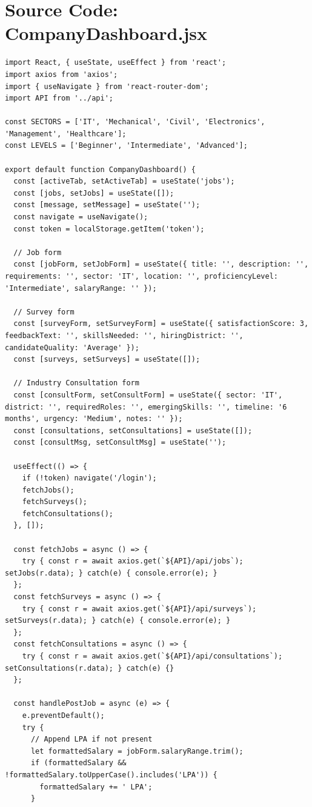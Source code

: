 \documentclass[12pt,a4paper]{report}
\begin{document}
\section*{Source Code: CompanyDashboard.jsx}
\begin{verbatim}
import React, { useState, useEffect } from 'react';
import axios from 'axios';
import { useNavigate } from 'react-router-dom';
import API from '../api';

const SECTORS = ['IT', 'Mechanical', 'Civil', 'Electronics', 'Management', 'Healthcare'];
const LEVELS = ['Beginner', 'Intermediate', 'Advanced'];

export default function CompanyDashboard() {
  const [activeTab, setActiveTab] = useState('jobs');
  const [jobs, setJobs] = useState([]);
  const [message, setMessage] = useState('');
  const navigate = useNavigate();
  const token = localStorage.getItem('token');

  // Job form
  const [jobForm, setJobForm] = useState({ title: '', description: '', requirements: '', sector: 'IT', location: '', proficiencyLevel: 'Intermediate', salaryRange: '' });

  // Survey form
  const [surveyForm, setSurveyForm] = useState({ satisfactionScore: 3, feedbackText: '', skillsNeeded: '', hiringDistrict: '', candidateQuality: 'Average' });
  const [surveys, setSurveys] = useState([]);

  // Industry Consultation form
  const [consultForm, setConsultForm] = useState({ sector: 'IT', district: '', requiredRoles: '', emergingSkills: '', timeline: '6 months', urgency: 'Medium', notes: '' });
  const [consultations, setConsultations] = useState([]);
  const [consultMsg, setConsultMsg] = useState('');

  useEffect(() => {
    if (!token) navigate('/login');
    fetchJobs();
    fetchSurveys();
    fetchConsultations();
  }, []);

  const fetchJobs = async () => {
    try { const r = await axios.get(`${API}/api/jobs`); setJobs(r.data); } catch(e) { console.error(e); }
  };
  const fetchSurveys = async () => {
    try { const r = await axios.get(`${API}/api/surveys`); setSurveys(r.data); } catch(e) { console.error(e); }
  };
  const fetchConsultations = async () => {
    try { const r = await axios.get(`${API}/api/consultations`); setConsultations(r.data); } catch(e) {}
  };

  const handlePostJob = async (e) => {
    e.preventDefault();
    try {
      // Append LPA if not present
      let formattedSalary = jobForm.salaryRange.trim();
      if (formattedSalary && !formattedSalary.toUpperCase().includes('LPA')) {
        formattedSalary += ' LPA';
      }
      

\end{verbatim}
\end{document}
